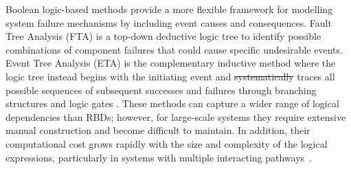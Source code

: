 \documentclass[preprint,12pt]{elsarticle}
\makeatletter
\providecommand{\DIFdeltex}[1]{{\protect\color{red}\sout{#1}}} %
\providecommand{\DIFdelbegin}{} %
\providecommand{\DIFdelend}{} %
\providecommand{\DIFdel}[1]{\texorpdfstring{\DIFdeltex{#1}}{}} %
\providecommand{\DIFscaledelfig}{0.5}
\newlength{\DIFdelgraphicswidth} %
\newlength{\DIFdelgraphicsheight} %
\providecommand{\DIFdelincludegraphics}[2][]{%
\sbox{\DIFdelgraphicsbox}{\DIFOincludegraphics[#1]{#2}}%
\settoboxwidth{\DIFdelgraphicswidth}{\DIFdelgraphicsbox} %
\settoboxtotalheight{\DIFdelgraphicsheight}{\DIFdelgraphicsbox} %
\scalebox{\DIFscaledelfig}{%
\parbox[b]{\DIFdelgraphicswidth}{\usebox{\DIFdelgraphicsbox}\\[-\baselineskip] \rule{\DIFdelgraphicswidth}{0em}}\llap{\resizebox{\DIFdelgraphicswidth}{\DIFdelgraphicsheight}{%
\setlength{\unitlength}{\DIFdelgraphicswidth}%
\begin{picture}(1,1)%
\thicklines\linethickness{2pt} %
{\color[rgb]{1,0,0}\put(0,0){\framebox(1,1){}}}%
{\color[rgb]{1,0,0}\put(0,0){\line( 1,1){1}}}%
{\color[rgb]{1,0,0}\put(0,1){\line(1,-1){1}}}%
\end{picture}%
}\hspace*{3pt}}} %
} %
\DeclareRobustCommand{\DIFdelbegin}{\DIFOdelbegin \let\includegraphics\DIFdelincludegraphics} %
\DeclareRobustCommand{\DIFdelend}{\DIFOaddend \let\includegraphics\DIFOincludegraphics} %
\let\sout@orig\sout %
\renewcommand{\sout}[1]{\ifmmode\text{\sout@orig{\ensuremath{#1}}}\else\sout@orig{#1}\fi} %
\makeatother
\begin{document}
Boolean logic-based methods provide a more flexible framework for modelling system failure mechanisms by including event causes and consequences. Fault Tree Analysis (FTA) \cite{xing_fault_2008} is a top-down deductive logic tree to identify possible combinations of component failures that could cause specific undesirable events. Event Tree Analysis (ETA) is the complementary inductive method where the logic tree instead begins with the initiating event and \DIFdelbegin \DIFdel{systematically }\DIFdelend traces all possible sequences of subsequent successes and failures through branching structures and logic gates \cite{cepin_event_2011}. These methods can capture a wider range of logical dependencies than RBDs; however, for large-scale systems they require extensive manual construction and become difficult to maintain. In addition, their computational cost grows rapidly with the size and complexity of the logical expressions, particularly in systems with multiple interacting pathways~\cite{sherwin_fault_1993,xing_fault_2008}.
\end{document}
